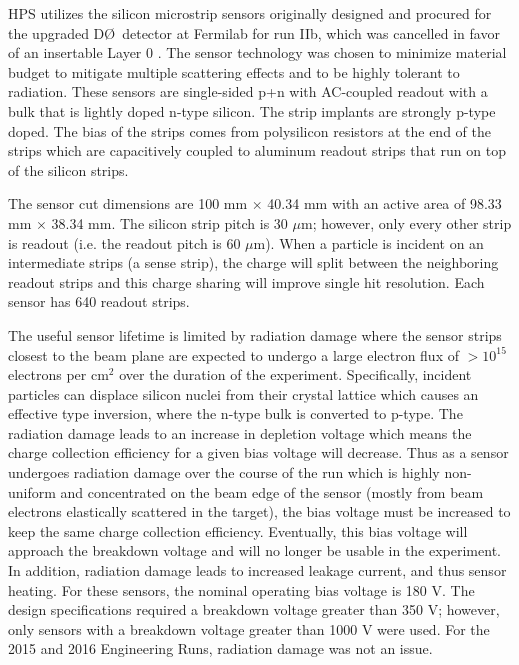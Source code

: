 HPS utilizes the silicon microstrip sensors originally designed and procured for the upgraded D\O \  detector at Fermilab for run IIb, which was cancelled in favor of an insertable Layer 0 \cite{D0Collab:2003}. The sensor technology was chosen to minimize material budget to mitigate multiple scattering effects and to be highly tolerant to radiation. These sensors are single-sided p+n with AC-coupled readout with a bulk that is lightly doped n-type silicon. The strip implants are strongly p-type doped. The bias of the strips comes from polysilicon resistors at the end of the strips which are capacitively coupled to aluminum readout strips that run on top of the silicon strips.

The sensor cut dimensions are 100 mm $\times$ 40.34 mm with an active area of 98.33 mm $\times$ 38.34 mm. The silicon strip pitch is 30 $\mu$m; however, only every other strip is readout (i.e. the readout pitch is 60 $\mu$m). When a particle is incident on an intermediate strips (a sense strip), the charge will split between the neighboring readout strips and this charge sharing will improve single hit resolution. Each sensor has 640 readout strips.

The useful sensor lifetime is limited by radiation damage where the sensor strips closest to the beam plane are expected to undergo a large electron flux of $>10^{15}$ electrons per cm$^2$ over the duration of the experiment. Specifically, incident particles can displace silicon nuclei from their crystal lattice which causes an effective type inversion, where the n-type bulk is converted to p-type. The radiation damage leads to an increase in depletion voltage which means the charge collection efficiency for a given bias voltage will decrease. Thus as a sensor undergoes radiation damage over the course of the run which is highly non-uniform and concentrated on the beam edge of the sensor (mostly from beam electrons elastically scattered in the target), the bias voltage must be increased to keep the same charge collection efficiency. Eventually, this bias voltage will approach the breakdown voltage and will no longer be usable in the experiment. In addition, radiation damage leads to increased leakage current, and thus sensor heating. For these sensors, the nominal operating bias voltage is 180 V. The design specifications required a breakdown voltage greater than 350 V; however, only sensors with a breakdown voltage greater than 1000 V were used. For the 2015 and 2016 Engineering Runs, radiation damage was not an issue. 

